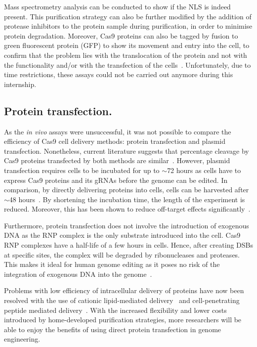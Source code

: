 \documentclass[11pt]{article}
\begin{document}
Mass spectrometry analysis can be conducted to show if the NLS is indeed present. This purification strategy can also be further modified by the addition of protease inhibitors to the protein sample during purification, in order to minimise protein degradation. Moreover, Cas9 proteins can also be tagged by fusion to green fluorescent protein (GFP) to show its movement and entry into the cell, to confirm that the problem lies with the translocation of the protein and not with the functionality and/or with the transfection of the cells~\citep{Zuris2014}. Unfortunately, due to time restrictions, these assays could not be carried out anymore during this internship.

\subsection{Protein transfection.}
As the \textit{in vivo} assays were unsuccessful, it was not possible to compare the efficiency of Cas9 cell delivery methods: protein transfection and plasmid transfection. Nonetheless, current literature suggests that percentage cleavage by Cas9 proteins transfected by both methods are similar~\citep{Kim2014}. However, plasmid transfection requires cells to be incubated for up to $\sim$72 hours as cells have to express Cas9 proteins and its gRNAs before the genome can be edited. In comparison, by directly delivering proteins into cells, cells can be harvested after $\sim$48 hours~\citep{Kleinstiver2016a, Zuris2014}. By shortening the incubation time, the length of the experiment is reduced. Moreover, this has been shown to reduce off-target effects significantly~\citep{Kim2014}.

Furthermore, protein transfection does not involve the introduction of exogenous DNA as the RNP complex is the only substrate introduced into the cell. Cas9 RNP complexes have a half-life of a few hours in cells. Hence, after creating DSBs at specific sites, the complex will be degraded by ribonucleases and proteases. This makes it ideal for human genome editing as it poses no risk of the integration of exogenous DNA into the genome~\citep{Hendel2015, Ramalingam2013}. 

Problems with low efficiency of intracellular delivery of proteins have now been resolved with the use of cationic lipid-mediated delivery~\citep{Zuris2014} and cell-penetrating peptide mediated delivery~\citep{Ramakrishna2014}. With the increased flexibility and lower costs introduced by home-developed purification strategies, more researchers will be able to enjoy the benefits of using direct protein transfection in genome engineering.
\end{document}
